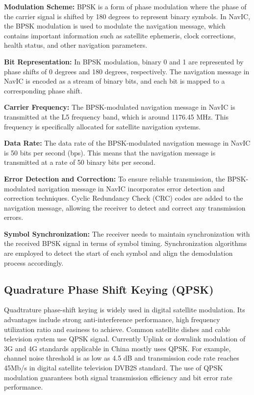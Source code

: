 \documentclass[onecolumn]{article}
\begin{document}
\begin{enumerate}
\begin{Large}
\textbf{Modulation Scheme:} BPSK is a form of phase modulation where the phase of the carrier signal is shifted by 180 degrees to represent binary symbols. In NavIC, the BPSK modulation is used to modulate the navigation message, which contains important information such as satellite ephemeris, clock corrections, health status, and other navigation parameters.

\textbf{Bit Representation:} In BPSK modulation, binary 0 and 1 are represented by phase shifts of 0 degrees and 180 degrees, respectively. The navigation message in NavIC is encoded as a stream of binary bits, and each bit is mapped to a corresponding phase shift.

\textbf{Carrier Frequency:} The BPSK-modulated navigation message in NavIC is transmitted at the L5 frequency band, which is around 1176.45 MHz. This frequency is specifically allocated for satellite navigation systems.

\textbf{Data Rate:} The data rate of the BPSK-modulated navigation message in NavIC is 50 bits per second (bps). This means that the navigation message is transmitted at a rate of 50 binary bits per second.

\textbf{Error Detection and Correction:} To ensure reliable transmission, the BPSK-modulated navigation message in NavIC incorporates error detection and correction techniques. Cyclic Redundancy Check (CRC) codes are added to the navigation message, allowing the receiver to detect and correct any transmission errors.

\textbf{Symbol Synchronization:} The receiver needs to maintain synchronization with the received BPSK signal in terms of symbol timing. Synchronization algorithms are employed to detect the start of each symbol and align the demodulation process accordingly.

\subsection{Quadrature Phase Shift Keying (QPSK)}

Quadtrature phase-shift keying is widely used in digital satellite modulation. Its advantages include
strong anti-interference performance, high frequency utilization ratio and easiness to achieve. Common satellite dishes and cable television system use QPSK signal. Currently Uplink or downlink modulation of 3G and 4G standards applicable in China mostly uses QPSK. For example, channel noise threshold is as low as 4.5 dB and transmission code rate reaches 45Mb/s in digital satellite television DVB2S standard. The use of QPSK modulation guarantees both signal transmission efficiency and bit error rate performance. 


\end{Large}
\end{enumerate}
\end{document}
